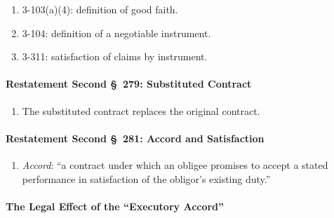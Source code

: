 \begin{enumerate}
    \item 3-103(a)(4): definition of good faith.
    \item 3-104: definition of a negotiable instrument.
    \item 3-311: satisfaction of claims by instrument.
\end{enumerate}

\paragraph{Restatement Second \S\ 279: Substituted Contract}

\begin{enumerate}
    \item The substituted contract replaces the original contract.
\end{enumerate}

\paragraph{Restatement Second \S\ 281: Accord and Satisfaction}

\begin{enumerate}
    \item \emph{Accord}: ``a contract under which an obligee promises to 
    accept a stated performance in satisfaction of the obligor's existing 
    duty.''
\end{enumerate}

\paragraph{The Legal Effect of the ``Executory Accord''}


